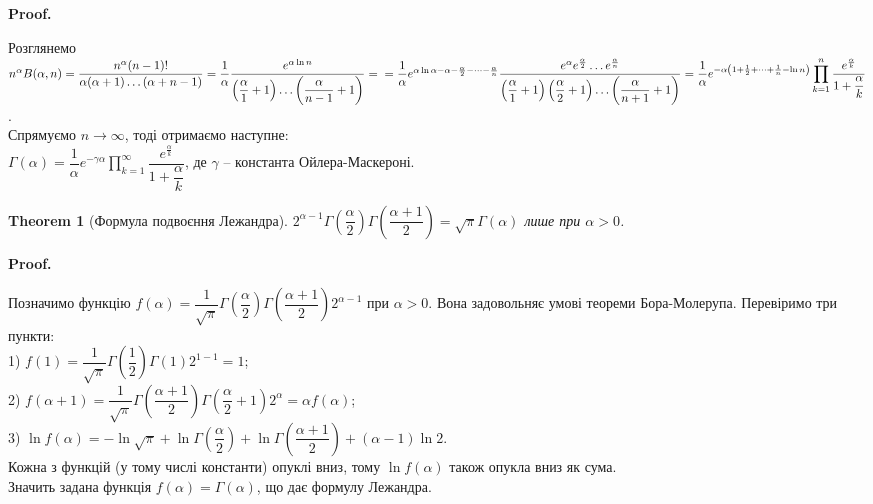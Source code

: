 \documentclass[a4paper, 10pt]{article}
\makeatletter
\theoremstyle{theoremdd}
\newtheorem{theorem}{Theorem}[subsection]
\theoremstyle{theoremdd}
\theoremstyle{theoremdd}
\theoremstyle{theoremdd}
\theoremstyle{theoremdd}
\theoremstyle{theoremdd}
\theoremstyle{theoremdd}
\theoremstyle{theoremdd}
\theoremstyle{theoremdd}
\renewenvironment{proof}[1][Proof.\\]{\par
\pushQED{\hfill \qed}%
\normalfont \topsep6\p@\@plus6\p@\relax
\trivlist
\item\relax
{\bfseries
#1\@addpunct{.}}\hspace\labelsep\ignorespaces
}{%
\popQED\endtrivlist\@endpefalse
}
\makeatother
\begin{document}
\begin{proof}
Розглянемо $n^\alpha B(\alpha,n) = \dfrac{n^\alpha(n-1)!}{\alpha (\alpha+1) \dots (\alpha+n-1)} = \dfrac{1}{\alpha} \dfrac{e^{\alpha \ln n}}{\left( \dfrac{\alpha}{1} + 1 \right) \dots \left( \dfrac{\alpha}{n-1} + 1 \right)} = \\
= \dfrac{1}{\alpha} e^{\alpha \ln \alpha - \alpha - \frac{\alpha}{2} - \dots - \frac{\alpha}{n}} \dfrac{e^\alpha e^{\frac{\alpha}{2}} \dots e^{\frac{\alpha}{n}}}{\left( \dfrac{\alpha}{1} + 1 \right)\left( \dfrac{\alpha}{2} + 1 \right)\dots \left( \dfrac{\alpha}{n+1} + 1 \right)} = \dfrac{1}{\alpha} e^{-\alpha \left( 1 + \frac{1}{2} + \dots + \frac{1}{n} - \ln n \right)} \displaystyle\prod_{k=1}^n \dfrac{e^{\frac{\alpha}{k}}}{1+\dfrac{\alpha}{k}}$.\\
Спрямуємо $n \to \infty$, тоді отримаємо наступне:\\
$\Gamma(\alpha) = \dfrac{1}{\alpha} e^{-\gamma \alpha} \displaystyle\prod_{k=1}^\infty \dfrac{e^{\frac{\alpha}{k}}}{1+\dfrac{\alpha}{k}}$, де $\gamma$ -- константа Ойлера-Маскероні.
\end{proof}

\begin{theorem}[Формула подвоєння Лежандра]
$2^{\alpha-1} \Gamma\left( \dfrac{\alpha}{2} \right) \Gamma\left( \dfrac{\alpha+1}{2} \right) = \sqrt{\pi} \Gamma(\alpha)$ лише при $\alpha >0$.
\end{theorem}

\begin{proof}
Позначимо функцію $f(\alpha) = \dfrac{1}{\sqrt{\pi}} \Gamma\left( \dfrac{\alpha}{2} \right) \Gamma\left( \dfrac{\alpha+1}{2} \right) 2^{\alpha-1}$ при $\alpha > 0$. Вона задовольняє умові теореми Бора-Молерупа. Перевіримо три пункти:\\
1) $f(1) = \dfrac{1}{\sqrt{\pi}} \Gamma\left( \dfrac{1}{2}\right) \Gamma(1) 2^{1-1} = 1$;\\
2) $f(\alpha+1) = \dfrac{1}{\sqrt{\pi}} \Gamma\left( \dfrac{\alpha+1}{2} \right) \Gamma\left( \dfrac{\alpha}{2}+1 \right)2^\alpha = \alpha f(\alpha)$;\\
3) $\ln f(\alpha) = -\ln \sqrt{\pi} + \ln \Gamma\left( \dfrac{\alpha}{2} \right) + \ln \Gamma\left( \dfrac{\alpha+1}{2} \right) + (\alpha-1)\ln 2$. \\
Кожна з функцій (у тому числі константи) опуклі вниз, тому $\ln f(\alpha)$ також опукла вниз як сума.\\
Значить задана функція $f(\alpha) = \Gamma(\alpha)$, що дає формулу Лежандра.
\end{proof}
\end{document}
